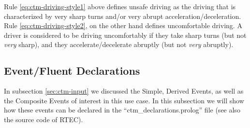 %
Rule \eqref{eq:ctm-driving-style1} above defines unsafe driving as the driving that is characterized by very sharp turns and/or very abrupt acceleration/deceleration. Rule \eqref{eq:ctm-driving-style2}, on the other hand defines uncomfortable driving. A driver is considered to be driving uncomfortably if they take sharp turns (but not \textit{very} sharp), and they accelerate/decelerate abruptly (but not \textit{very} abruptly).

\subsection{Event/Fluent Declarations}\label{sec:ctm-declarations}

In subsection \ref{sec:ctm-input} we discussed the Simple, Derived Events, as well as the Composite Events of interest in this use case. In this subsection we will show how these events can be declared in the ``ctm\_declarations.prolog'' file (see also the source code of RTEC).

